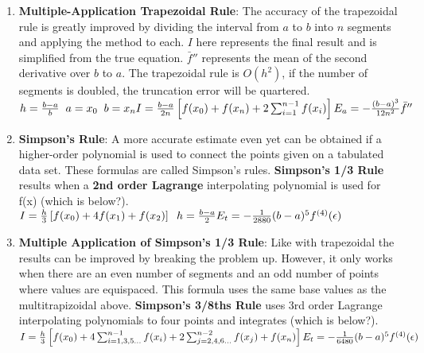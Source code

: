 \documentclass[fontsize=5pt]{scrartcl}
\begin{document}
\begin{multicols}{3}
\begin{enumerate}
      \item \textbf{Multiple-Application Trapezoidal Rule}: The accuracy of the trapezoidal rule is
        greatly improved by dividing the interval from $a$ to $b$ into $n$ segments and applying the
        method to each. $I$ here represents the final result and is simplified from the true equation. 
        $\bar{f}''$ represents the mean of the second derivative over $b$ to $a$. The trapezoidal rule
        is $O(h^2)$, if the number of segments is doubled, the truncation error will be quartered.\\
        \begin{math}
          h=\frac{b-a}{b} \hspace{2mm} a=x_0 \hspace{2mm} b=x_n \\
          I=\frac{b-a}{2n}\left[f(x_0)+f(x_n)+2\sum^{n-1}_{i=1}f(x_i)\right] \\
          E_a=-\frac{(b-a)^3}{12n^2}\bar{f}''
        \end{math}
      
      \item \textbf{Simpson's Rule}: A more accurate estimate even yet can be obtained if a higher-order polynomial is used
      to connect the points given on a tabulated data set. These formulas are called Simpson's rules. \textbf{Simpson's 1/3 Rule}
      results when a \textbf{2nd order Lagrange} interpolating polynomial is used for f(x) (which is below?). \\
      \begin{math}
        I=\frac{h}{3}\left[f(x_0)+4f(x_1)+f(x_2)\right]\hspace{2mm}h=\frac{b-a}{2} \\
        E_t=-\frac{1}{2880}(b-a)^5f^{(4)}(\epsilon)
      \end{math}

      \item \textbf{Multiple Application of Simpson's 1/3 Rule}: Like with trapezoidal the results can be improved
        by breaking the problem up. However, it only works when there are an even number of segments and an odd number
        of points where values are equispaced. This formula uses the same base values as the multitrapizoidal above.
        \textbf{Simpson's 3/8ths Rule} uses 3rd order Lagrange interpolating polynomials to four points and integrates
        (which is below?). \\
        
        \begin{math}
          I=\frac{h}{3}\left[ f(x_0)+4\sum_{i=1,3,5...}^{n-1}f(x_i)+ \\ 2\sum_{j=2,4,6...}^{n-2}f(x_j)+f(x_n) \right]
          E_t=-\frac{1}{6480}(b-a)^5f^{(4)}(\epsilon)
        \end{math}


\end{enumerate}
\end{multicols}
\end{document}
